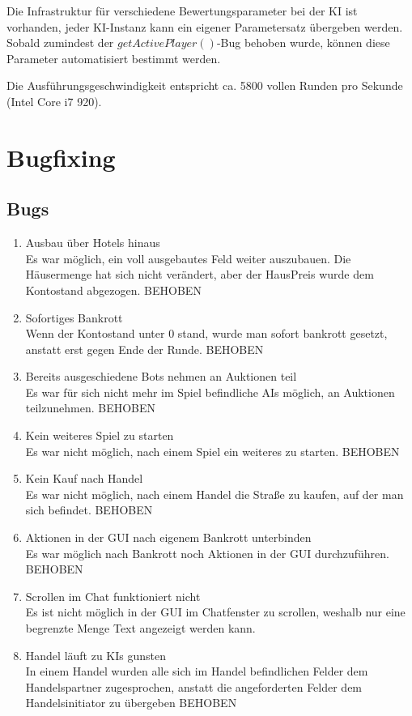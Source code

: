 \documentclass[a4paper,10pt]{article}
\begin{document}
Die Infrastruktur für verschiedene Bewertungsparameter bei der KI ist vorhanden, jeder KI-Instanz kann ein eigener Parametersatz übergeben werden. Sobald zumindest der $getActivePlayer()$-Bug behoben wurde, können diese Parameter automatisiert bestimmt werden.

Die Ausführungsgeschwindigkeit entspricht ca. 5800 vollen Runden pro Sekunde (Intel Core i7 920).

\section{Bugfixing}
\subsection{Bugs}
\begin{enumerate}
\item Ausbau über Hotels hinaus
\\Es war möglich, ein voll ausgebautes Feld weiter auszubauen. Die Häusermenge hat sich nicht verändert, aber der HausPreis wurde dem Kontostand abgezogen. BEHOBEN 
\item Sofortiges Bankrott
\\Wenn der Kontostand unter 0 stand, wurde man sofort bankrott gesetzt, anstatt erst gegen Ende der Runde. BEHOBEN
\item Bereits ausgeschiedene Bots nehmen an Auktionen teil
\\Es war für sich nicht mehr im Spiel befindliche AIs möglich, an Auktionen teilzunehmen. BEHOBEN
\item Kein weiteres Spiel zu starten
\\Es war nicht möglich, nach einem Spiel ein weiteres zu starten. BEHOBEN
\item Kein Kauf nach Handel
\\Es war nicht möglich, nach einem Handel die Straße zu kaufen, auf der man sich befindet. BEHOBEN
\item Aktionen in der GUI nach eigenem Bankrott unterbinden
\\Es war möglich nach Bankrott noch Aktionen in der GUI durchzuführen. BEHOBEN
\item Scrollen im Chat funktioniert nicht
\\Es ist nicht möglich in der GUI im Chatfenster zu scrollen, weshalb nur eine begrenzte Menge Text angezeigt werden kann.
\item Handel läuft zu KIs gunsten
\\In einem Handel wurden alle sich im Handel befindlichen Felder dem Handelspartner zugesprochen, anstatt die angeforderten Felder dem Handelsinitiator zu übergeben BEHOBEN

\end{enumerate}
\end{document}
